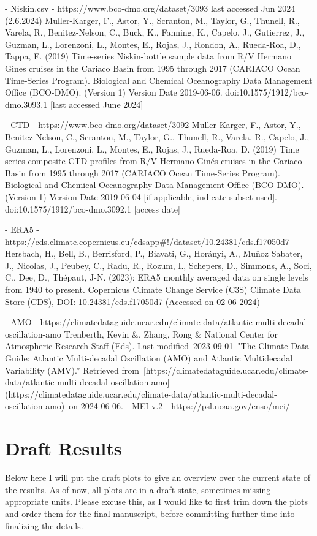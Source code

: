 \documentclass[draft]{agujournal2019}
\begin{document}
- Niskin.csv - https://www.bco-dmo.org/dataset/3093
	last accessed Jun 2024 (2.6.2024)
	Muller-Karger, F., Astor, Y., Scranton, M., Taylor, G., Thunell, R., Varela, R., Benitez-Nelson, C., Buck, K., Fanning, K., Capelo, J., Gutierrez, J., Guzman, L., Lorenzoni, L., Montes, E., Rojas, J., Rondon, A., Rueda-Roa, D., Tappa, E. (2019) Time-series Niskin-bottle sample data from R/V Hermano Gines cruises in the Cariaco Basin from 1995 through 2017 (CARIACO Ocean Time-Series Program). Biological and Chemical Oceanography Data Management Office (BCO-DMO). (Version 1) Version Date 2019-06-06. doi:10.1575/1912/bco-dmo.3093.1 [last accessed June 2024]

- CTD - https://www.bco-dmo.org/dataset/3092
	Muller-Karger, F., Astor, Y., Benitez-Nelson, C., Scranton, M., Taylor, G., Thunell, R., Varela, R., Capelo, J., Guzman, L., Lorenzoni, L., Montes, E., Rojas, J., Rueda-Roa, D. (2019) Time series composite CTD profiles from R/V Hermano Ginés cruises in the Cariaco Basin from 1995 through 2017 (CARIACO Ocean Time-Series Program). Biological and Chemical Oceanography Data Management Office (BCO-DMO). (Version 1) Version Date 2019-06-04 [if applicable, indicate subset used]. doi:10.1575/1912/bco-dmo.3092.1 [access date]

- ERA5 - https://cds.climate.copernicus.eu/cdsapp#!/dataset/10.24381/cds.f17050d7
	Hersbach, H., Bell, B., Berrisford, P., Biavati, G., Horányi, A., Muñoz Sabater, J., Nicolas, J., Peubey, C., Radu, R., Rozum, I., Schepers, D., Simmons, A., Soci, C., Dee, D., Thépaut, J-N. (2023): ERA5 monthly averaged data on single levels from 1940 to present. Copernicus Climate Change Service (C3S) Climate Data Store (CDS), DOI: 10.24381/cds.f17050d7 (Accessed on 02-06-2024)


- AMO - https://climatedataguide.ucar.edu/climate-data/atlantic-multi-decadal-oscillation-amo 
	Trenberth, Kevin &, Zhang, Rong & National Center for Atmospheric Research Staff (Eds). Last modified 2023-09-01 "The Climate Data Guide: Atlantic Multi-decadal Oscillation (AMO) and Atlantic Multidecadal Variability (AMV).” Retrieved from [https://climatedataguide.ucar.edu/climate-data/atlantic-multi-decadal-oscillation-amo](https://climatedataguide.ucar.edu/climate-data/atlantic-multi-decadal-oscillation-amo) on 2024-06-06.
- MEI v.2 - https://psl.noaa.gov/enso/mei/

\section{Draft Results}
Below here I will put the draft plots to give an overview over the current state of the results. As of now, all plots are in a draft state, sometimes missing appropriate units. Please excuse this, as I would like to first trim down the plots and order them for the final manuscript, before committing further time into finalizing the details. 
\end{document}
